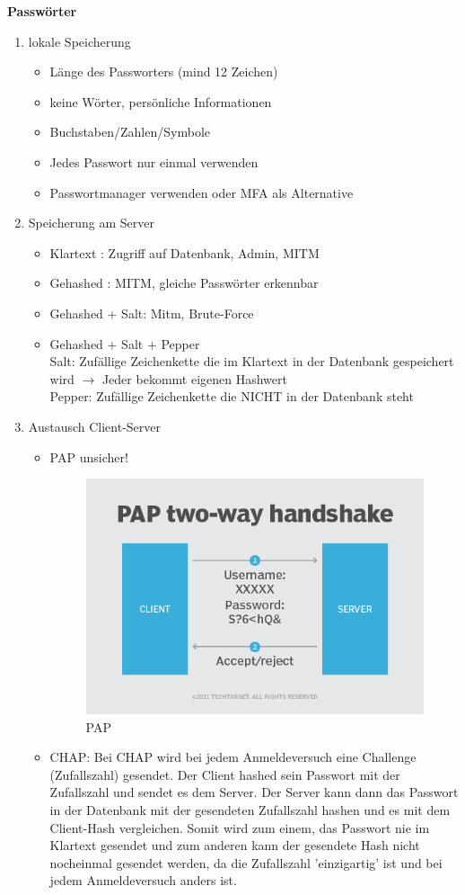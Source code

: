 \textbf{Passwörter} \\
\begin{enumerate}
	\item lokale Speicherung
	\begin{itemize}
		\item Länge des Passworters (mind 12 Zeichen)
		\item keine Wörter, persönliche Informationen
		\item Buchstaben/Zahlen/Symbole
		\item Jedes Passwort nur einmal verwenden
		\item Passwortmanager verwenden oder MFA als Alternative
	\end{itemize}
	\item Speicherung am Server
	\begin{itemize}
		\item Klartext \Lightning: Zugriff auf Datenbank, Admin, MITM
		\item Gehashed \Lightning: MITM, gleiche Passwörter erkennbar
		\item Gehashed + Salt: Mitm, Brute-Force
		\item Gehashed + Salt + Pepper \\
		Salt: Zufällige Zeichenkette die im Klartext in der Datenbank gespeichert wird $\rightarrow$ Jeder bekommt eigenen Hashwert \\
		Pepper: Zufällige Zeichenkette die NICHT in der Datenbank steht
	\end{itemize}
	\item Austausch Client-Server
	\begin{itemize}
		\item PAP unsicher! 
		\begin{figure}[H]
			\centering
			\includegraphics[width=0.6\linewidth]{figures/pap.png}
			\caption{PAP}
		\end{figure}
		\item CHAP: Bei CHAP wird bei jedem Anmeldeversuch eine Challenge (Zufallszahl) gesendet. Der Client hashed sein Passwort mit der Zufallszahl und sendet es dem Server. Der Server kann dann das Passwort in der Datenbank mit der gesendeten Zufallszahl hashen und es mit dem Client-Hash vergleichen. Somit wird zum einem, das Passwort nie im Klartext gesendet und zum anderen kann der gesendete Hash nicht nocheinmal gesendet werden, da die Zufallszahl 'einzigartig' ist und bei jedem Anmeldeversuch anders ist. \\

\end{itemize}
\end{enumerate}
